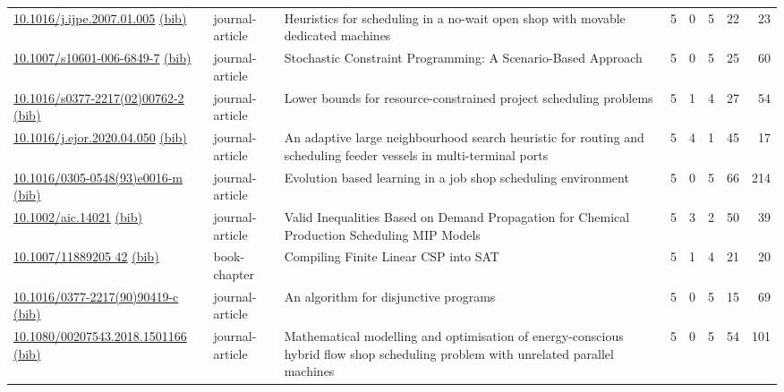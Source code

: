 {\begin{longtable}{p{5cm}lp{11cm}rrrrr}
\href{http://dx.doi.org/10.1016/j.ijpe.2007.01.005}{10.1016/j.ijpe.2007.01.005} \href{https://www.doi2bib.org/bib/10.1016/j.ijpe.2007.01.005}{(bib)} & journal-article & Heuristics for scheduling in a no-wait open shop with movable dedicated machines & 5 & 0 & 5 & 22 & 23 \\
\href{http://dx.doi.org/10.1007/s10601-006-6849-7}{10.1007/s10601-006-6849-7} \href{https://www.doi2bib.org/bib/10.1007/s10601-006-6849-7}{(bib)} & journal-article & Stochastic Constraint Programming: A Scenario-Based Approach & 5 & 0 & 5 & 25 & 60 \\
\href{http://dx.doi.org/10.1016/s0377-2217(02)00762-2}{10.1016/s0377-2217(02)00762-2} \href{https://www.doi2bib.org/bib/10.1016/s0377-2217(02)00762-2}{(bib)} & journal-article & Lower bounds for resource-constrained project scheduling problems & 5 & 1 & 4 & 27 & 54 \\
\href{http://dx.doi.org/10.1016/j.ejor.2020.04.050}{10.1016/j.ejor.2020.04.050} \href{https://www.doi2bib.org/bib/10.1016/j.ejor.2020.04.050}{(bib)} & journal-article & An adaptive large neighbourhood search heuristic for routing and scheduling feeder vessels in multi-terminal ports & 5 & 4 & 1 & 45 & 17 \\
\href{http://dx.doi.org/10.1016/0305-0548(93)e0016-m}{10.1016/0305-0548(93)e0016-m} \href{https://www.doi2bib.org/bib/10.1016/0305-0548(93)e0016-m}{(bib)} & journal-article & Evolution based learning in a job shop scheduling environment & 5 & 0 & 5 & 66 & 214 \\
\href{http://dx.doi.org/10.1002/aic.14021}{10.1002/aic.14021} \href{https://www.doi2bib.org/bib/10.1002/aic.14021}{(bib)} & journal-article & Valid Inequalities Based on Demand Propagation for Chemical Production Scheduling MIP Models & 5 & 3 & 2 & 50 & 39 \\
\href{http://dx.doi.org/10.1007/11889205_42}{10.1007/11889205 42} \href{https://www.doi2bib.org/bib/10.1007/11889205_42}{(bib)} & book-chapter & Compiling Finite Linear CSP into SAT & 5 & 1 & 4 & 21 & 20 \\
\href{http://dx.doi.org/10.1016/0377-2217(90)90419-c}{10.1016/0377-2217(90)90419-c} \href{https://www.doi2bib.org/bib/10.1016/0377-2217(90)90419-c}{(bib)} & journal-article & An algorithm for disjunctive programs & 5 & 0 & 5 & 15 & 69 \\
\href{http://dx.doi.org/10.1080/00207543.2018.1501166}{10.1080/00207543.2018.1501166} \href{https://www.doi2bib.org/bib/10.1080/00207543.2018.1501166}{(bib)} & journal-article & Mathematical modelling and optimisation of energy-conscious hybrid flow shop scheduling problem with unrelated parallel machines & 5 & 0 & 5 & 54 & 101 \\

\end{longtable}}

